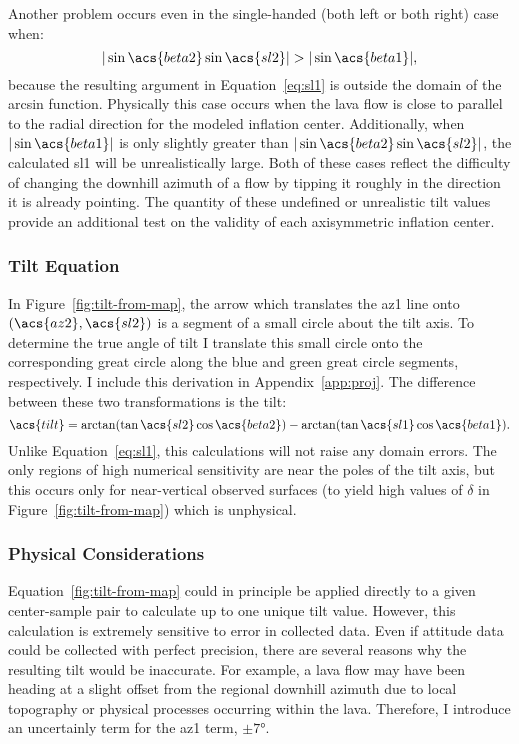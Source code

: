 Another problem occurs even in the single-handed (both left or both right) case when:
\begin{equation}
     |\sin\acs{beta2}\sin\acs{sl2}| > |\sin\acs{beta1}|,\label{eq:domain-error}
\end{equation}
because the resulting argument in Equation~\eqref{eq:sl1} is outside the domain of the arcsin function. Physically this case occurs when the lava flow is close to parallel to the radial direction for the modeled inflation center. Additionally, when $|\sin\acs{beta1}|$ is only slightly greater than $|\sin\acs{beta2}\sin\acs{sl2}|$, the calculated \acs{sl1} will be unrealistically large. Both of these cases reflect the difficulty of changing the downhill azimuth of a flow by tipping it roughly in the direction it is already pointing. The quantity of these undefined or unrealistic tilt values provide an additional test on the validity of each axisymmetric inflation center.

\subsubsection{Tilt Equation}

In Figure~\ref{fig:tilt-from-map}, the arrow which translates the \acs{az1} line onto $\left(\acs{az2},\acs{sl2}\right)$ is a segment of a small circle about the tilt axis. To determine the true angle of tilt I translate this small circle onto the corresponding great circle along the blue and green great circle segments, respectively. I include this derivation in Appendix~\ref{app:proj}. The difference between these two transformations is the tilt: 
\begin{equation}
    \acs{tilt} = \arctan(\tan\acs{sl2}\cos\acs{beta2}) - \arctan(\tan\acs{sl1}\cos\acs{beta1}).\label{eq:tilt-from-map}
\end{equation}
Unlike Equation~\eqref{eq:sl1}, this calculations will not raise any domain errors. The only regions of high numerical sensitivity are near the poles of the tilt axis, but this occurs only for near-vertical observed surfaces (to yield high values of $\delta$ in Figure~\ref{fig:tilt-from-map}) which is unphysical.

\subsubsection{Physical Considerations}

Equation~\eqref{fig:tilt-from-map} could in principle be applied directly to a given center-sample pair to calculate up to one unique tilt value. However, this calculation is extremely sensitive to error in collected data. Even if attitude data could be collected with perfect precision, there are several reasons why the resulting tilt would be inaccurate. For example, a lava flow may have been heading at a slight offset from the regional downhill azimuth due to local topography or physical processes occurring within the lava. Therefore, I introduce an uncertainly term for the \acs{az1} term, $\pm\ang{7}$. 

